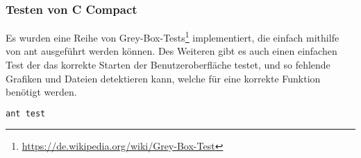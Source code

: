 \subsubsection{Testen von C Compact}

Es wurden eine Reihe von Grey-Box-Tests\footnote{\url{https://de.wikipedia.org/wiki/Grey-Box-Test}} implementiert, die einfach mithilfe von ant ausgef\"uhrt werden k\"onnen. Des Weiteren gibt es auch einen einfachen Test der das korrekte Starten der Benutzeroberfl\"ache testet, und so fehlende Grafiken und Dateien detektieren kann, welche f\"ur eine korrekte Funktion ben\"otigt werden.

\begin{lstlisting}[language=bash]
ant test
\end{lstlisting}